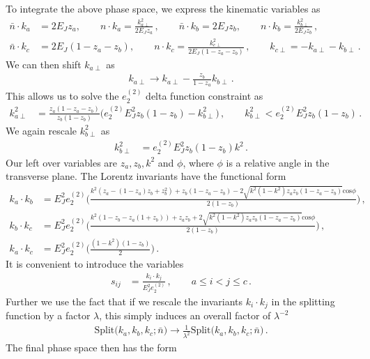 \documentclass[a4paper,11pt]{article}
\newcommand{\nbar}{{\bar n}}
\newcommand{\ecf}[2]{e_{#1}^{(#2)}}
\newcommand{\nn}{\nonumber}
\def\nbar{\bar n}
\begin{document}
To integrate the above phase space, we express the kinematic variables as
\begin{align}
\nbar\cdot k_a&=2 E_Jz_a,\qquad  n\cdot k_a=\frac{k_{a\perp}^2}{2 E_Jz_a}\,, \qquad
\nbar\cdot k_b=2 E_Jz_b,\qquad n\cdot k_b=\frac{k_{b\perp}^2}{2 E_Jz_b}\,,\nn\\
\nbar\cdot k_c&=2 E_J(1-z_a-z_b),\qquad n\cdot k_c=\frac{k_{c\perp}^2}{2 E_J(1-z_a-z_b)}\,,\qquad
k_{c\perp}=-k_{a\perp}-k_{b\perp}\,.
\end{align}
We can then shift $k_{a\perp}$ as
\begin{align}
k_{a\perp}\rightarrow k_{a\perp}-\frac{z_b}{1-z_a}k_{b\perp}\,.
\end{align}
This allows us to solve the $\ecf{2}{2}$ delta function constraint as
\begin{align}
k_{a\perp}^2&=\frac{z_a(1-z_a-z_b)}{z_b(1-z_b)}\Big(\ecf{2}{2}E_J^2z_b(1-z_b)-k_{b\perp}^2\Big)\,,\qquad k_{b\perp}^2<\ecf{2}{2}E_J^2z_b(1-z_b)\,.
\end{align}
We again rescale $k_{b\perp}^2$ as
\begin{align}
k_{b\perp}^2&=\ecf{2}{2}E_J^2z_b(1-z_b)k^2\,.
\end{align}
Our left over variables are $z_a,z_b,k^2$ and $\phi$, where $\phi$ is a relative angle in the transverse plane. The Lorentz invariants have the functional form
{\small\begin{align}
k_{a}\cdot k_{b}&=E_J^2\ecf{2}{2}\Bigg(\frac{k^2(z_a-(1-z_a)z_b+z_b^2)+z_b(1-z_a-z_b)-2\sqrt{k^2(1-k^2)z_az_b(1-z_a-z_b)}\text{cos}\phi}{2(1-z_b)}\Bigg)\,, \nn\\
k_{b}\cdot k_{c}&=E_J^2\ecf{2}{2}\Bigg(\frac{k^2(1-z_b-z_a(1+z_b))+z_az_b+2\sqrt{k^2(1-k^2)z_az_b(1-z_a-z_b)}\text{cos}\phi}{2(1-z_b)}\Bigg)\,,\nn\\
k_{a}\cdot k_{c}&=E_J^2\ecf{2}{2}\Bigg(\frac{(1-k^2)(1-z_b)}{2}\Bigg)\,.
\end{align}}
It is convenient to introduce the variables
\begin{align}
s_{ij}&=\frac{k_i\cdot k_j}{E_J^2\ecf{2}{2}}\,,\qquad a\leq i<j\leq c\,.
\end{align}
Further we use the fact that if we rescale the invariants $k_i\cdot k_j$ in the splitting function by a factor $\lambda$, this simply induces an overall factor of $\lambda^{-2}$
\begin{align}
\text{Split}\Big( k_a,k_b,k_c;\nbar\Big)\rightarrow\frac{1}{\lambda^2}\text{Split}\Big( k_a,k_b,k_c;\nbar\Big)\,.
\end{align}
The final phase space then has the form
\end{document}
